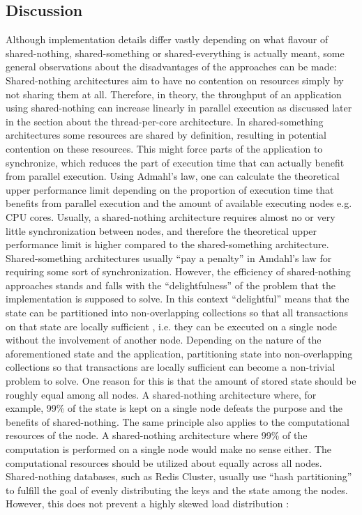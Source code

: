 \subsection{Discussion}
Although implementation details differ vastly depending on what flavour of shared-nothing, shared-something or shared-everything is actually meant, some general observations about the disadvantages of the approaches can be made: 
Shared-nothing architectures aim to have no contention on resources simply by not sharing them at all. Therefore, in theory, the throughput of an application using shared-nothing can increase linearly in parallel execution as discussed later in the section about the thread-per-core architecture. In shared-something architectures some resources are  shared by definition, resulting in potential contention on these resources. This might force parts of the application to synchronize, which reduces the part of execution time that can actually benefit from parallel execution. Using Admahl’s law, one can calculate the theoretical upper performance limit depending on the proportion of execution time that benefits from parallel execution and the amount of available executing nodes \cite[13-14]{herlihy:art_of_mp} e.g. CPU cores. Usually, a shared-nothing architecture requires almost no or very little synchronization between nodes, and therefore the theoretical upper performance limit is higher compared to the shared-something architecture. Shared-something architectures usually “pay a penalty” in Amdahl’s law for requiring some sort of synchronization. \newline
However, the efficiency of shared-nothing approaches stands and falls with the “delightfulness” of the problem that the implementation is supposed to solve. In this context “delightful” means that the state can be partitioned into non-overlapping collections so that all transactions on that state are locally sufficient \cite{stonebraker:shared_nothing}, i.e. they can be executed on a single node without the involvement of another node. Depending on the nature of the aforementioned state and the application, partitioning state into non-overlapping collections so that transactions are locally sufficient can become a non-trivial problem to solve. One reason for this is that the amount of stored state should be roughly equal among all nodes. A shared-nothing architecture where, for example, 99\% of the state is kept on a single node defeats the purpose and the benefits of shared-nothing. The same principle also applies to the computational resources of the node. A shared-nothing architecture where 99\% of the computation is performed on a single node would make no sense either. The computational resources should be utilized about equally across all nodes. Shared-nothing databases, such as Redis Cluster, usually use “hash partitioning” \cite[205]{kleppmann:data} to fulfill the goal of evenly distributing the keys and the state among the nodes. However, this does not prevent a highly skewed load distribution \cite{amazon:dynamo}: \newline
